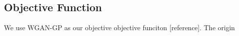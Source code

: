 \subsection{Objective Function}
We use WGAN-GP as our objective objective funciton [reference]. The origin 